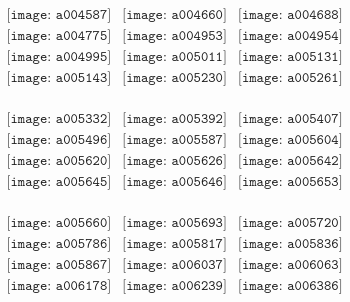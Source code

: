 \documentclass{article}
\begin{document}
\begin{figure}[H]
 \begin{center}$
 \begin{array}{cccc}
\texttt{[image: a004587]}&\texttt{[image: a004660]}&\texttt{[image: a004688]}\\\texttt{[image: a004775]}&\texttt{[image: a004953]}&\texttt{[image: a004954]}\\\texttt{[image: a004995]}&\texttt{[image: a005011]}&\texttt{[image: a005131]}\\\texttt{[image: a005143]}&\texttt{[image: a005230]}&\texttt{[image: a005261]}\\
\end{array}$
\end{center}
\end{figure}

\begin{figure}[H]
 \begin{center}$
 \begin{array}{cccc}
\texttt{[image: a005332]}&\texttt{[image: a005392]}&\texttt{[image: a005407]}\\\texttt{[image: a005496]}&\texttt{[image: a005587]}&\texttt{[image: a005604]}\\\texttt{[image: a005620]}&\texttt{[image: a005626]}&\texttt{[image: a005642]}\\\texttt{[image: a005645]}&\texttt{[image: a005646]}&\texttt{[image: a005653]}\\
\end{array}$
\end{center}
\end{figure}

\begin{figure}[H]
 \begin{center}$
 \begin{array}{cccc}
\texttt{[image: a005660]}&\texttt{[image: a005693]}&\texttt{[image: a005720]}\\\texttt{[image: a005786]}&\texttt{[image: a005817]}&\texttt{[image: a005836]}\\\texttt{[image: a005867]}&\texttt{[image: a006037]}&\texttt{[image: a006063]}\\\texttt{[image: a006178]}&\texttt{[image: a006239]}&\texttt{[image: a006386]}\\
\end{array}$
\end{center}
\end{figure}
\end{document}
